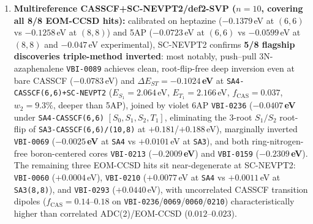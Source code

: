 \documentclass[10pt,twocolumn]{article}
\theoremstyle{natthm}
\newcommand{\dEST}{\Delta E_{ST}}
\begin{document}
\begin{enumerate}
  \item \textbf{Multireference CASSCF+SC-NEVPT2/def2-SVP ($n=10$, covering all 8/8 EOM-CCSD hits):} calibrated on heptazine ($-0.1379$\,eV at $(6,6)$ vs $-0.1258$\,eV at $(8,8)$) and 5AP ($-0.0723$\,eV at $(6,6)$ vs $-0.0599$\,eV at $(8,8)$ and $-0.047$\,eV experimental\cite{wilson2024}), SC-NEVPT2 confirms \textbf{5/8 flagship discoveries triple-method inverted}: most notably, push--pull 3N-azaphenalene \texttt{VBI-0089} achieves clean, root-flip-free deep inversion even at bare CASSCF ($-0.0783$\,eV) and \textbf{$\dEST=-0.1024$\,eV} at \texttt{SA4-CASSCF(6,6)+SC-NEVPT2} ($E_{S_1}=2.064$\,eV, $E_{T_1}=2.166$\,eV, $f_{\mathrm{CAS}}=0.037$, $w_2=9.3\%$, deeper than 5AP), joined by violet 6AP \texttt{VBI-0236} (\textbf{$-0.0407$\,eV} under \texttt{SA4-CASSCF(6,6)} $[S_0,S_1,S_2,T_1]$, eliminating the 3-root $S_1/S_2$ root-flip of \texttt{SA3-CASSCF(6,6)/(10,8)} at $+0.181$/$+0.188$\,eV), marginally inverted \texttt{VBI-0069} (\textbf{$-0.0025$\,eV} at \texttt{SA4} vs $+0.0101$\,eV at \texttt{SA3}), and both ring-nitrogen-free boron-centered cores \texttt{VBI-0213} (\textbf{$-0.2009$\,eV}) and \texttt{VBI-0159} (\textbf{$-0.2309$\,eV}). The remaining three EOM-CCSD hits sit near-degenerate at SC-NEVPT2: \texttt{VBI-0060} ($+0.0004$\,eV), \texttt{VBI-0210} ($+0.0077$\,eV at \texttt{SA4} vs $+0.0011$\,eV at \texttt{SA3(8,8)}), and \texttt{VBI-0293} ($+0.0440$\,eV), with uncorrelated CASSCF transition dipoles ($f_{\mathrm{CAS}}=0.14$--$0.18$ on \texttt{VBI-0236}/\texttt{0069}/\texttt{0060}/\texttt{0210}) characteristically higher than correlated ADC(2)/EOM-CCSD ($0.012$--$0.023$).
\end{enumerate}
\end{document}
